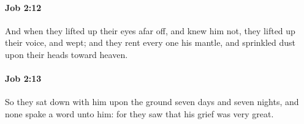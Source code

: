 		\paragraph{Job 2:12} %
			\label{JOB-2-12}

			And when they lifted up their eyes afar off, and knew him not, they lifted up their voice, and wept; and they rent every one his mantle, and sprinkled dust upon their heads toward heaven.


		\paragraph{Job 2:13} %
			\label{JOB-2-13}

			So they sat down with him upon the ground seven days and seven nights, and none spake a word unto him: for they saw that his grief was very great.

